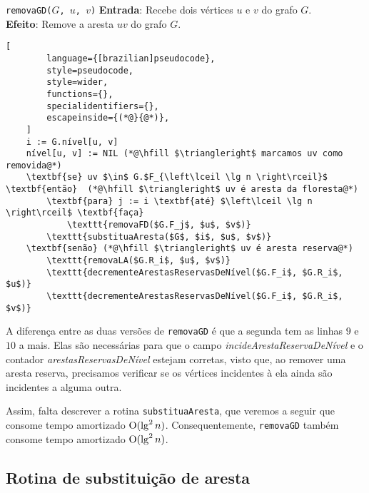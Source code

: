 \begin{programruledcaption}{\texttt{removaGD($G$, $u$, $v$)} \label{prog:removeGD-version2}}
    \noindent\textbf{Entrada}: Recebe dois vértices $u$ e $v$ do grafo $G$. \\
    \noindent\textbf{Efeito}: Remove a aresta $uv$ do grafo $G$. 
    \vspace{-0.5\baselineskip}
    \begin{lstlisting}[
        language={[brazilian]pseudocode},
        style=pseudocode,
        style=wider,
        functions={},
        specialidentifiers={},
        escapeinside={(*@}{@*)},
    ]
    i := G.nível[u, v]
    nível[u, v] := NIL (*@\hfill $\triangleright$ marcamos uv como removida@*)
    \textbf{se} uv $\in$ G.$F_{\left\lceil \lg n \right\rceil}$ \textbf{então}  (*@\hfill $\triangleright$ uv é aresta da floresta@*)
        \textbf{para} j := i \textbf{até} $\left\lceil \lg n \right\rceil$ \textbf{faça}
            \texttt{removaFD($G.F_j$, $u$, $v$)}
        \texttt{substituaAresta($G$, $i$, $u$, $v$)}
    \textbf{senão} (*@\hfill $\triangleright$ uv é aresta reserva@*)
        \texttt{removaLA($G.R_i$, $u$, $v$)}
        \texttt{decrementeArestasReservasDeNível($G.F_i$, $G.R_i$, $u$)}
        \texttt{decrementeArestasReservasDeNível($G.F_i$, $G.R_i$, $v$)}
    \end{lstlisting}
    \vspace{-0.5\baselineskip}
\end{programruledcaption}

A diferença entre as duas versões de \texttt{removaGD} é que a segunda tem as linhas $9$ e $10$ a mais. Elas são necessárias para que o campo \textit{incideArestaReservaDeNível} e o contador \textit{arestasReservasDeNível} estejam corretas, visto que, ao remover uma aresta reserva, precisamos verificar se os vértices incidentes à ela ainda são incidentes a alguma outra. 

Assim, falta descrever a rotina \texttt{substituaAresta}, que veremos a seguir que consome tempo amortizado $\mathrm{O}(\lg^2 n)$. Consequentemente, \texttt{removaGD} também consome tempo amortizado $\mathrm{O}(\lg^2 n)$.

\subsection{Rotina de substituição de aresta}
\label{sec:replace-edge}

